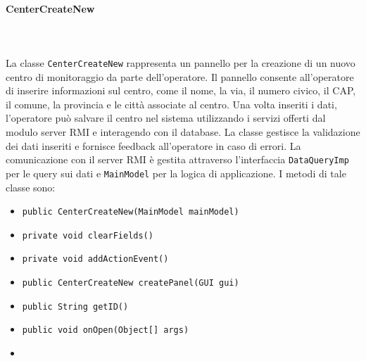 \paragraph{CenterCreateNew}\\
\\
La classe \texttt{CenterCreateNew} rappresenta un pannello per la creazione di un nuovo centro di monitoraggio da parte dell'operatore.
Il pannello consente all'operatore di inserire informazioni sul centro, come il nome, la via, il numero civico, il CAP, il comune, la provincia e le città associate al centro. 
Una volta inseriti i dati, l'operatore può salvare il centro nel sistema utilizzando i servizi offerti dal modulo server RMI e interagendo con il database.
La classe gestisce la validazione dei dati inseriti e fornisce feedback all'operatore in caso di errori. 
La comunicazione con il server RMI è gestita attraverso l'interfaccia \texttt{DataQueryImp} per le query sui dati e \texttt{MainModel} per la logica di applicazione.
I metodi di tale classe sono:
\begin{itemize}
    \item \texttt{public CenterCreateNew(MainModel mainModel)}
    \item \texttt{private void clearFields()}
    \item \texttt{private void addActionEvent()}
    \item \texttt{public CenterCreateNew createPanel(GUI gui)}
    \item \texttt{public String getID()}
    \item \texttt{public void onOpen(Object[] args)}
    \item 
\end{itemize}

